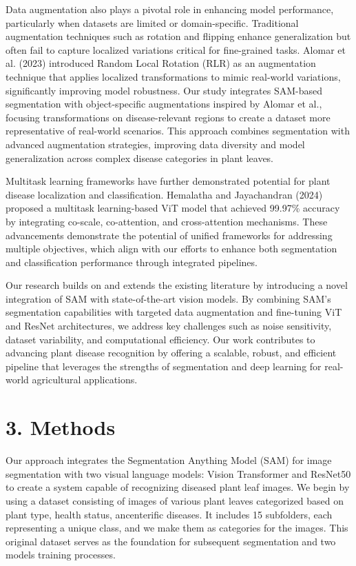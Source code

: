 \documentclass{article}
\begin{document}
Data augmentation also plays a pivotal role in enhancing model performance, particularly when datasets are limited or domain-specific. Traditional augmentation techniques such as rotation and flipping enhance generalization but often fail to capture localized variations critical for fine-grained tasks. Alomar et al. (2023) introduced Random Local Rotation (RLR) as an augmentation technique that applies localized transformations to mimic real-world variations, significantly improving model robustness. Our study integrates SAM-based segmentation with object-specific augmentations inspired by Alomar et al., focusing transformations on disease-relevant regions to create a dataset more representative of real-world scenarios. This approach combines segmentation with advanced augmentation strategies, improving data diversity and model generalization across complex disease categories in plant leaves.

Multitask learning frameworks have further demonstrated potential for plant disease localization and classification. Hemalatha and Jayachandran (2024) proposed a multitask learning-based ViT model that achieved 99.97\% accuracy by integrating co-scale, co-attention, and cross-attention mechanisms. These advancements demonstrate the potential of unified frameworks for addressing multiple objectives, which align with our efforts to enhance both segmentation and classification performance through integrated pipelines.

Our research builds on and extends the existing literature by introducing a novel integration of SAM with state-of-the-art vision models. By combining SAM’s segmentation capabilities with targeted data augmentation and fine-tuning ViT and ResNet architectures, we address key challenges such as noise sensitivity, dataset variability, and computational efficiency. Our work contributes to advancing plant disease recognition by offering a scalable, robust, and efficient pipeline that leverages the strengths of segmentation and deep learning for real-world agricultural applications.


\section*{3. Methods}

Our approach integrates the Segmentation Anything Model (SAM) for image segmentation with two visual language models: Vision Transformer and ResNet50 to create a system capable of recognizing diseased plant leaf images. We begin by using a dataset consisting of images of various plant leaves categorized based on plant type, health status, ancenterific diseases. It includes 15 subfolders, each representing a unique class, and we make them as categories for the images. This original dataset serves as the foundation for subsequent segmentation and two models training processes.
\end{document}
